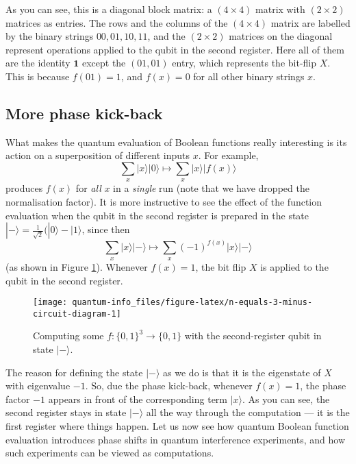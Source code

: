 \documentclass[fleqn]{article}
\begin{document}
As you can see, this is a diagonal block matrix: a \((4\times 4)\) matrix with \((2\times 2)\) matrices as entries.
The rows and the columns of the \((4\times 4)\) matrix are labelled by the binary strings \(00, 01, 10, 11\), and the \((2\times 2)\) matrices on the diagonal represent operations applied to the qubit in the second register.
Here all of them are the identity \(\mathbf{1}\) except the \((01, 01)\) entry, which represents the bit-flip \(X\).
This is because \(f(01)=1\), and \(f(x)=0\) for all other binary strings \(x\).

\hypertarget{more-phase-kick-back}{%
\subsection{More phase kick-back}\label{more-phase-kick-back}}

What makes the quantum evaluation of Boolean functions really interesting is its action on a superposition of different inputs \(x\).
For example,
\[
  \sum_{x}|x\rangle|0\rangle
  \longmapsto
  \sum_{x}|x\rangle|f(x)\rangle
\]
produces \(f(x)\) for \emph{all} \(x\) in a \emph{single} run (note that we have dropped the normalisation factor).
It is more instructive to see the effect of the function evaluation when the qubit in the second register is prepared in the state \(|-\rangle = \frac{1}{\sqrt 2}(|0\rangle - |1\rangle\), since then
\[
  \sum_x|x\rangle|-\rangle
  \longmapsto
  \sum_x (-1)^{f(x)}|x\rangle|-\rangle
\]
(as shown in Figure \ref{fig:n-equals-3-minus-circuit-diagram}).
Whenever \(f(x)=1\), the bit flip \(X\) is applied to the qubit in the second register.



\begin{figure}[H]

{\centering \texttt{[image: quantum-info\_files/figure-latex/n-equals-3-minus-circuit-diagram-1]} 

}

\caption{Computing some \(f\colon\{0,1\}^3\to\{0,1\}\) with the second-register qubit in state \(|-\rangle\).}\label{fig:n-equals-3-minus-circuit-diagram}
\end{figure}

The reason for defining the state \(|-\rangle\) as we do is that it is the eigenstate of \(X\) with eigenvalue \(-1\).
So, due the phase kick-back, whenever \(f(x)=1\), the phase factor \(-1\) appears in front of the corresponding term \(|x\rangle\).
As you can see, the second register stays in state \(|-\rangle\) all the way through the computation --- it is the first register where things happen.
Let us now see how quantum Boolean function evaluation introduces phase shifts in quantum interference experiments, and how such experiments can be viewed as computations.
\end{document}
